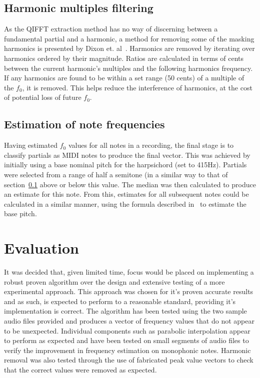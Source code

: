 \documentclass[titlepage]{scrartcl}
\begin{document}
\subsection{Harmonic multiples filtering}\label{HMF}
As the QIFFT extraction method has no way of discerning between a fundamental
partial and a harmonic, a method for removing some of the masking harmonics is
presented by Dixon et. al~\citeyearpar{Dixon2012}. Harmonics are removed by
iterating over harmonics ordered by their magnitude. Ratios are calculated in
terms of cents between the current harmonic's multiples and the following
harmonics frequency. If any harmonics are found to be within a set range (50
cents) of a multiple of the $f_0$, it is removed. This helps reduce the
interference of harmonics, at the cost of potential loss of future $f_0$.

\subsection{Estimation of note frequencies}
Having estimated $f_0$ values for all notes in a recording, the final stage is
to classify partials as MIDI notes to produce the final vector. This was
achieved by initially using a base nominal pitch for the harpsichord (set to
415Hz). Partials were selected from a range of half a semitone (in a similar
way to that of section~\ref{HMF} above or below this value. The median was then
calculated to produce an estimate for this note. From this, estimates for all
subsequent notes could be calculated in a similar manner, using the formula
described in~\parencite{Scarff2017} to estimate the base pitch.

\section{Evaluation}
It was decided that, given limited time, focus would be placed on implementing
a robust proven algorithm over the design and extensive testing of a more
experimental approach. This approach was chosen for it's proven accurate
results and as such, is expected to perform to a reasonable standard, providing
it's implementation is correct. The algorithm has been tested using the two
sample audio files provided and produces a vector of frequency values that do
not appear to be unexpected. Individual components such as parabolic
interpolation appear to perform as expected and have been tested on small
segments of audio files to verify the improvement in frequency estimation on
monophonic notes. Harmonic removal was also tested through the use of
fabricated peak value vectors to check that the correct values were removed as
expected.\\
\end{document}
